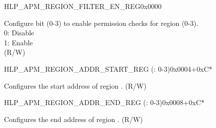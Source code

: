 \begin{register}{H}{LP\_APM\_REGION\_FILTER\_EN\_REG}{0x0000}\label{regdesc:LPAPMREGIONFILTERENREG}
%
%
\regnewline%
\begin{regdesc}\begin{reglist}
\label{fielddesc:LPAPMREGIONFILTEREN}\item [LP\_APM\_REGION\_FILTER\_EN] Configure bit  (0-3) to enable permission checks for region  (0-3).\\ 
0: Disable \\ 
1: Enable  \\ (R/W)
\end{reglist}\end{regdesc}
\end{register}


\begin{register}{H}{LP\_APM\_REGION\_ADDR\_START\_REG (: 0-3)}{0x0004+0xC*}\label{regdesc:LPAPMREGIONNADDRSTARTREG}
%
\regnewline%
\begin{regdesc}\begin{reglist}
\label{fielddesc:LPAPMREGIONNADDRSTART}\item [LP\_APM\_REGION\regindex{n}\_ADDR\_START] Configures the start address of region . (R/W)
\end{reglist}\end{regdesc}
\end{register}


\begin{register}{H}{LP\_APM\_REGION\_ADDR\_END\_REG (: 0-3)}{0x0008+0xC*}\label{regdesc:LPAPMREGIONNADDRENDREG}
%
\regnewline%
\begin{regdesc}\begin{reglist}
\label{fielddesc:LPAPMREGIONNADDREND}\item [LP\_APM\_REGION\regindex{n}\_ADDR\_END] Configures the end address of region . (R/W)
\end{reglist}\end{regdesc}
\end{register}


